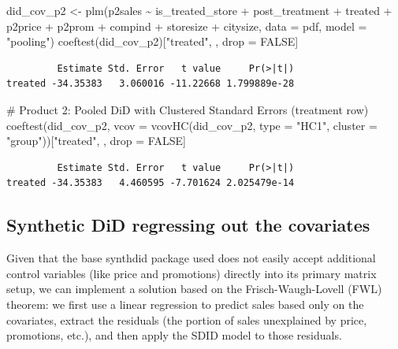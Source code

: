 \documentclass[
  letterpaper,
  DIV=11,
  numbers=noendperiod]{scrartcl}
\newenvironment{Shaded}{\begin{snugshade}}{\end{snugshade}}
\newcommand{\AttributeTok}[1]{\textcolor[rgb]{0.40,0.45,0.13}{#1}}
\newcommand{\CommentTok}[1]{\textcolor[rgb]{0.37,0.37,0.37}{#1}}
\newcommand{\ConstantTok}[1]{\textcolor[rgb]{0.56,0.35,0.01}{#1}}
\newcommand{\FunctionTok}[1]{\textcolor[rgb]{0.28,0.35,0.67}{#1}}
\newcommand{\NormalTok}[1]{\textcolor[rgb]{0.00,0.23,0.31}{#1}}
\newcommand{\OtherTok}[1]{\textcolor[rgb]{0.00,0.23,0.31}{#1}}
\newcommand{\SpecialCharTok}[1]{\textcolor[rgb]{0.37,0.37,0.37}{#1}}
\newcommand{\StringTok}[1]{\textcolor[rgb]{0.13,0.47,0.30}{#1}}
\begin{document}
\begin{Shaded}
\begin{Highlighting}[]
\NormalTok{did\_cov\_p2 }\OtherTok{\textless{}{-}} \FunctionTok{plm}\NormalTok{(p2sales }\SpecialCharTok{\textasciitilde{}}\NormalTok{ is\_treated\_store }\SpecialCharTok{+}\NormalTok{ post\_treatment }\SpecialCharTok{+}\NormalTok{ treated }\SpecialCharTok{+}
\NormalTok{                            p2price }\SpecialCharTok{+}\NormalTok{ p2prom }\SpecialCharTok{+}\NormalTok{ compind }\SpecialCharTok{+}\NormalTok{ storesize }\SpecialCharTok{+}\NormalTok{ citysize,}
                  \AttributeTok{data =}\NormalTok{ pdf,}
                  \AttributeTok{model =} \StringTok{"pooling"}\NormalTok{)}
\FunctionTok{coeftest}\NormalTok{(did\_cov\_p2)[}\StringTok{"treated"}\NormalTok{, , drop }\OtherTok{=} \ConstantTok{FALSE}\NormalTok{]}
\end{Highlighting}
\end{Shaded}

\begin{verbatim}
         Estimate Std. Error   t value     Pr(>|t|)
treated -34.35383   3.060016 -11.22668 1.799889e-28
\end{verbatim}

\begin{Shaded}
\begin{Highlighting}[]
\CommentTok{\# Product 2: Pooled DiD with Clustered Standard Errors (treatment row)}
\FunctionTok{coeftest}\NormalTok{(did\_cov\_p2, }
         \AttributeTok{vcov =} \FunctionTok{vcovHC}\NormalTok{(did\_cov\_p2,}
         \AttributeTok{type =} \StringTok{"HC1"}\NormalTok{,}
         \AttributeTok{cluster =} \StringTok{"group"}\NormalTok{))[}\StringTok{"treated"}\NormalTok{, , drop }\OtherTok{=} \ConstantTok{FALSE}\NormalTok{]}
\end{Highlighting}
\end{Shaded}

\begin{verbatim}
         Estimate Std. Error   t value     Pr(>|t|)
treated -34.35383   4.460595 -7.701624 2.025479e-14
\end{verbatim}

\subsection{Synthetic DiD regressing out the
covariates}\label{synthetic-did-regressing-out-the-covariates}

Given that the base synthdid package used does not easily accept
additional control variables (like price and promotions) directly into
its primary matrix setup, we can implement a solution based on the
Frisch-Waugh-Lovell (FWL) theorem: we first use a linear regression to
predict sales based only on the covariates, extract the residuals (the
portion of sales unexplained by price, promotions, etc.), and then apply
the SDID model to those residuals.
\end{document}
